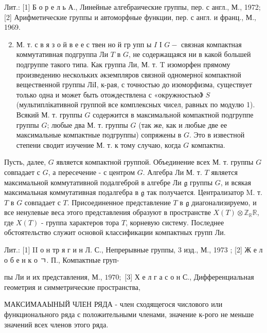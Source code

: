 \documentclass[10pt]{article}
\begin{document}
Лит.: [1] Б о р е л ь А., Линейные алгебраические группы, пер. с англ., М., 1972; [2] Арифметические группы и автоморфные функции, пер. с англ. и франц., М., 1969.



\begin{enumerate}

  \setcounter{enumi}{1}

  \item М. т. с в я з о й в е е с твен но й гр упп ы $I$ І $G-$ связная компактная коммутативная подгруппа Ли $T$ в $G$, не содержащаяся ни в какой большей подгруппе такого типа. Как группа Ли, М. т. T изоморфен прямому произведению нескольких әкземпляров связной одномерної компактной вещественной группы ЛіІ, к-рая, с точностью до изоморфизма, существует только одна и может быть отождествлена с «окружностью》 $S$ (мультиплікативной группой все комплексных чисел, равных по модулю 1). Всякий М. т. группы $G$ содержится в максимальной компактной подгруппе группы $G$; любые два М. т. группы $G$ (так же, как и любые две ее максимальные компактные подгруппы) сопряжены в $G$. Это в известной степени сводит изучение М. т. к тому случаю, когда $G$ компактна.

\end{enumerate}



Пусть, далее, $G$ является компактной группой. Объединение всех М. т. группы $G$ совпадает с $G$, а пересечение - с центром $G$. Алгебра Ли М. т. $T$ является максимальной коммутативной подалгеброй в алгебре Ли $\mathfrak{g}$ группы $G$, и всякая максимальная коммутативная подалгебра в $\mathfrak{g}$ так получается. Централизатор M. т. $T$ в $G$ совпадает с $T$. Присоединенное представление $T$ в $\mathfrak{g}$ диагонализируемо, и все ненулевые веса этого представления образуют в пространстве $X(T) \otimes \mathbb{Z}_{\mathbb{R}} \mathbb{R}$, где $X(T)$ - группа характеров тора $T$, корневую систему. Последнее обстоятельство служит основой классификации компактных групп Ли.



Лит.: [1] II о н тр я г и н Л. С., Непрерывные группы, 3 изд., М., 1973 ; [2] Ж е л о б е н к о ㄱ. П., Компактные груп-

пы Ли и их представления, М., $1970 ;$ [3] Х е л г а с о н С., Дифференциальная геометрия и симметрические пространства,



МАКСИМААЫНЫЙ ЧЛЕН РЯДА - член сходящегося числового или функционального ряда с положительными членами, значение к-рого не меньше значений всех членов этого ряда.
\end{document}
